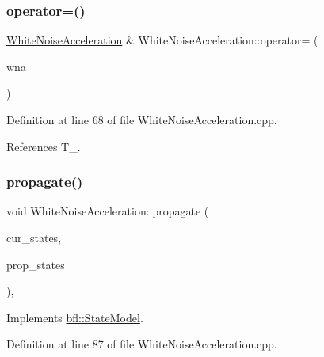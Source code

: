 \subsubsection{\texorpdfstring{operator=()}{operator=()}\hspace{0.1cm}{\footnotesize\ttfamily [2/2]}}
{\footnotesize\ttfamily \mbox{\hyperlink{classbfl_1_1WhiteNoiseAcceleration}{White\+Noise\+Acceleration}} \& White\+Noise\+Acceleration\+::operator= (\begin{DoxyParamCaption}\item[{\mbox{\hyperlink{classbfl_1_1WhiteNoiseAcceleration}{White\+Noise\+Acceleration}} \&\&}]{wna }\end{DoxyParamCaption})\hspace{0.3cm}{\ttfamily [noexcept]}}



Definition at line 68 of file White\+Noise\+Acceleration.\+cpp.



References T\+\_\+.

\mbox{\label{classbfl_1_1WhiteNoiseAcceleration_a1c2f938f535c20c78447a69c76c6896b}} 
\subsubsection{\texorpdfstring{propagate()}{propagate()}}
{\footnotesize\ttfamily void White\+Noise\+Acceleration\+::propagate (\begin{DoxyParamCaption}\item[{const Eigen\+::\+Ref$<$ const Eigen\+::\+Matrix\+Xf $>$ \&}]{cur\+\_\+states,  }\item[{Eigen\+::\+Ref$<$ Eigen\+::\+Matrix\+Xf $>$}]{prop\+\_\+states }\end{DoxyParamCaption})\hspace{0.3cm}{\ttfamily [override]}, {\ttfamily [virtual]}}



Implements \mbox{\hyperlink{classbfl_1_1StateModel_a47a625abb7df9b7afa689ccb9aa11aee}{bfl\+::\+State\+Model}}.



Definition at line 87 of file White\+Noise\+Acceleration.\+cpp.



